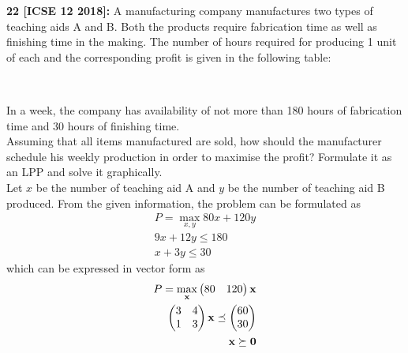 \documentclass[journal,12pt,twocolumn]{IEEEtran}
\begin{document}


    \textbf{22 [ICSE 12 2018]: } A manufacturing company manufactures two types of teaching aids A and B. Both the products require fabrication time as well as finishing time in the making. The number of hours required for producing 1 unit of each and the corresponding profit is given in the following table:\\
    \begin{table}[htb]
        \tiny
        \\
        \caption{}
    \end{table}
    In a week, the company has availability of not more than 180 hours of fabrication time and 30 hours of finishing time.\\
    Assuming that all items manufactured are sold, how should the manufacturer schedule his weekly production in order to maximise the profit? Formulate it as an LPP and solve it graphically.\\
    \solution Let $x$ be the number of teaching aid A and $y$ be the number of teaching aid B produced.  From the given information, the problem can be formulated as
    \begin{align}
        P = \max_{x,y}80x+120y
        \\
        9x+12y \le 180
        \\
        x+3y \le 30
    \end{align}
    which can be expressed in vector form as
    \begin{align}
        P = \max_{\mathbf{x}}\begin{pmatrix}80 & 120\end{pmatrix}\mathbf{x}
        \\
        \begin{pmatrix}3                    & 4           \\ 1 & 3\end{pmatrix} \mathbf{x}\preceq \begin{pmatrix}60 \\ 30\end{pmatrix}
        \\
        \mathbf{x} \succeq \mathbf{0}
    \end{align}
\end{document}
